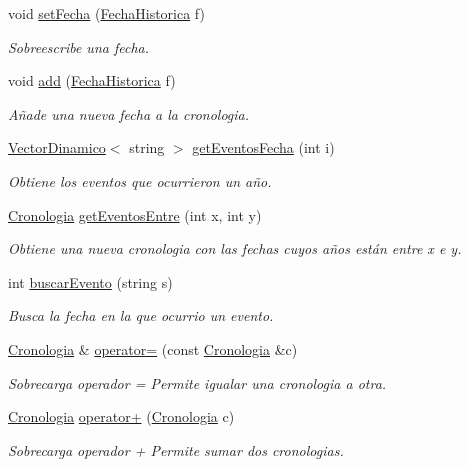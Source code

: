 \begin{DoxyCompactItemize}
void \hyperlink{classCronologia_a959656bb869865363d796f330fa54ddf}{set\+Fecha} (\hyperlink{classFechaHistorica}{Fecha\+Historica} f)
\begin{DoxyCompactList}\small\item\em Sobreescribe una fecha. \end{DoxyCompactList}\item 
void \hyperlink{classCronologia_a074d231653a08d759ddeb6e5788029f9}{add} (\hyperlink{classFechaHistorica}{Fecha\+Historica} f)
\begin{DoxyCompactList}\small\item\em Añade una nueva fecha a la cronologia. \end{DoxyCompactList}\item 
\hyperlink{classVectorDinamico}{Vector\+Dinamico}$<$ string $>$ \hyperlink{classCronologia_a46137f8c227dc4184dfe9333117108de}{get\+Eventos\+Fecha} (int i)
\begin{DoxyCompactList}\small\item\em Obtiene los eventos que ocurrieron un año. \end{DoxyCompactList}\item 
\hyperlink{classCronologia}{Cronologia} \hyperlink{classCronologia_afd3720750a474b15b082208cf5e557c8}{get\+Eventos\+Entre} (int x, int y)
\begin{DoxyCompactList}\small\item\em Obtiene una nueva cronologia con las fechas cuyos años están entre x e y. \end{DoxyCompactList}\item 
int \hyperlink{classCronologia_a0f9892e61445f393e9c74ba1fc2631c5}{buscar\+Evento} (string s)
\begin{DoxyCompactList}\small\item\em Busca la fecha en la que ocurrio un evento. \end{DoxyCompactList}\item 
\hyperlink{classCronologia}{Cronologia} \& \hyperlink{classCronologia_ac9fddecd2c0a8416d7896d61c74e4dd8}{operator=} (const \hyperlink{classCronologia}{Cronologia} \&c)
\begin{DoxyCompactList}\small\item\em Sobrecarga operador = Permite igualar una cronologia a otra. \end{DoxyCompactList}\item 
\hyperlink{classCronologia}{Cronologia} \hyperlink{classCronologia_a1011faa8363ae7a196301f7693151fad}{operator+} (\hyperlink{classCronologia}{Cronologia} c)
\begin{DoxyCompactList}\small\item\em Sobrecarga operador + Permite sumar dos cronologias. \end{DoxyCompactList}\end{DoxyCompactItemize}
